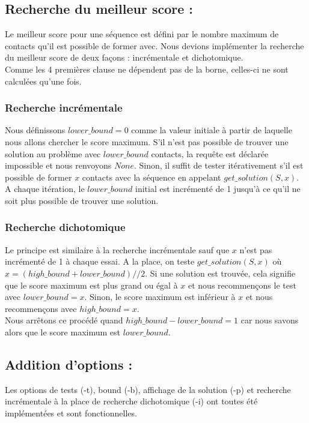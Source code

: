\documentclass[utf8]{article}
\begin{document}
\subsection{Recherche du meilleur score :}
Le meilleur score pour une séquence est défini par le nombre maximum de contacts qu'il est possible de former avec.
Nous devions implémenter la recherche du meilleur score de deux façons : incrémentale et dichotomique.\\
Comme les 4 premières clause ne dépendent pas de la borne, celles-ci ne sont calculées qu'une fois.

\subsubsection{Recherche incrémentale}
Nous définissons $ lower\_bound = 0 $ comme la valeur initiale à partir de laquelle nous allons chercher le score maximum. S'il n'est pas possible de trouver une solution au problème avec $lower\_bound$ contacts, la requête est déclarée impossible et nous renvoyons $None$.
Sinon, il suffit de tester itérativement s'il est possible de former $x$ contacts avec la séquence en appelant $get\_solution(S, x)$. A chaque itération, le $lower\_bound$ initial est incrémenté de 1 jusqu'à ce qu'il ne soit plus possible de trouver une solution.

\subsubsection{Recherche dichotomique}

Le principe est similaire à la recherche incrémentale sauf que $x$ n'est pas incrémenté de 1 à chaque essai. A la place, on teste $get\_solution(S, x)$ où $x = (high\_bound + lower\_bound)//2$. Si une solution est trouvée, cela signifie que le score maximum est plus grand ou égal à $x$ et nous recommençons le test avec $lower\_bound = x$. Sinon, le score maximum est inférieur à $x$ et nous recommençons avec $high\_bound = x$. \\
Nous arrêtons ce procédé quand $high\_bound - lower\_bound = 1$ car nous savons alors que le score maximum est $lower\_bound$.

\subsection{Addition d'options :}

Les options de tests (-t), bound (-b), affichage de la solution (-p) et recherche incrémentale à la place de recherche dichotomique (-i) ont toutes été implémentées et sont fonctionnelles.
\end{document}
